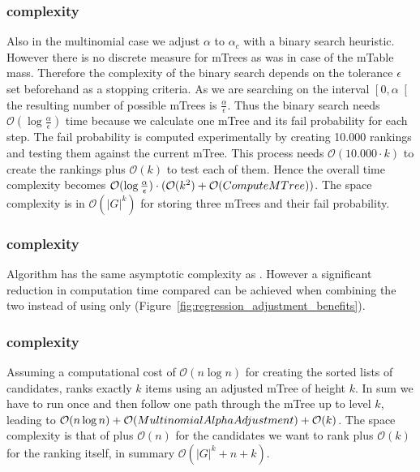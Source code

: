 \subsubsection{\algoMultBinary complexity}\label{subsubsec:multBinary-complexity}
Also in the multinomial case we adjust $\alpha$ to $\alpha_c$ with a binary search heuristic. 
%
However there is no discrete measure for mTrees as was in case of the mTable mass. 
%
Therefore the complexity of the binary search depends on the tolerance $\epsilon$ set beforehand as a stopping criteria. 
%
As we are searching on the interval $\left[0,\alpha\right[$ the resulting number of possible mTrees is $\frac{\alpha}{\epsilon}$.
%
Thus the binary search needs $\mathcal{O}(\log{}\frac{\alpha}{\epsilon})$ time because we calculate one mTree and its fail probability for each step. 
%
The fail probability is computed experimentally by creating 10.000 rankings and testing them against the current mTree. 
%
This process needs $\mathcal{O}(10.000 \cdot k)$ to create the rankings plus $\mathcal{O}(k)$ to test each of them. 
%
Hence the overall time complexity becomes $\mathcal{O}(\log{}\frac{\alpha}{\epsilon}) \cdot (\mathcal{O}(k^2) + \mathcal{O}({\sc ComputeMTree}))$. 
%
The space complexity is in $\mathcal{O}(|G|^k)$ for storing three mTrees and their fail probability.
%
\subsubsection{\algoReg complexity}\label{subsubsec:regression-complexity}
Algorithm \algoReg has the same asymptotic complexity as \algoMultBinary. 
%
However a significant reduction in computation time compared can be achieved when combining the two instead of using \algoMultBinary only (Figure~\ref{fig:regression_adjustment_benefits}).
%
\subsubsection{\algoFAIR complexity}\label{subsubsec:FAIR-complexity}
Assuming a computational cost of $\mathcal{O}(n \log{} n)$ for creating the sorted lists of candidates, \algoFAIR ranks exactly $k$ items using an adjusted mTree of height $k$. 
%
In sum we have to run \algoMultBinary once and then follow one path through the mTree up to level $k$, leading to $\mathcal{O}(n \log{} n) + \mathcal{O} ({\sc MultinomialAlphaAdjustment}) + \mathcal{O}(k)$. 
%
The space complexity is that of \algoMultBinary plus $\mathcal{O}(n)$ for the candidates we want to rank plus $\mathcal{O}(k)$ for the ranking itself, in summary $\mathcal{O}(|G|^k + n + k)$.






